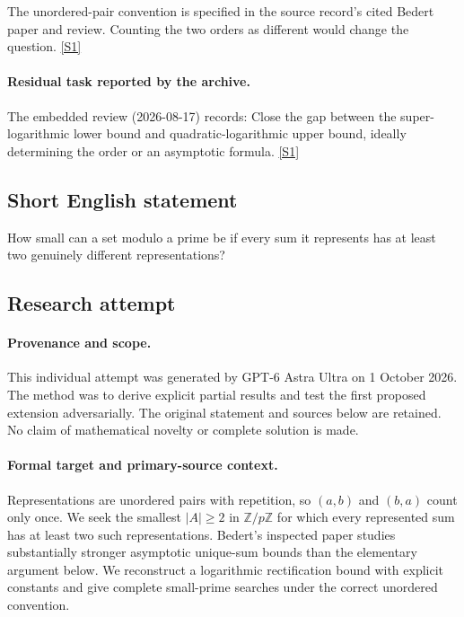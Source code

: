 \documentclass[11pt,a4paper]{article}
\newcommand{\Z}{\mathbb{Z}}
\newcommand{\sref}[2]{\hyperlink{source:#1:#2}{[S#2]}}
\begin{document}
The unordered-pair convention is specified in the source record’s cited Bedert paper and review. Counting the two orders as different would change the question. \sref{statement}{1}

\paragraph{Residual task reported by the archive.}

The embedded review (2026-08-17) records: Close the gap between the super-logarithmic lower bound and quadratic-logarithmic upper bound, ideally determining the order or an asymptotic formula. \sref{statement}{1}

\subsection{Short English statement}

How small can a set modulo a prime be if every sum it represents has at least two genuinely different representations?

\subsection{Research attempt}

\paragraph{Provenance and scope.}
This individual attempt was generated by GPT-6 Astra Ultra on 1 October 2026. The method was to derive explicit partial results and test the first proposed extension adversarially. The original statement and sources below are retained. No claim of mathematical novelty or complete solution is made.

\paragraph{Formal target and primary-source context.}
Representations are unordered pairs with repetition, so $(a,b)$ and $(b,a)$ count only once. We seek the smallest $|A|\geq2$ in $\Z/p\Z$ for which every represented sum has at least two such representations. Bedert's inspected paper studies substantially stronger asymptotic unique-sum bounds than the elementary argument below. We reconstruct a logarithmic rectification bound with explicit constants and give complete small-prime searches under the correct unordered convention.
\end{document}
